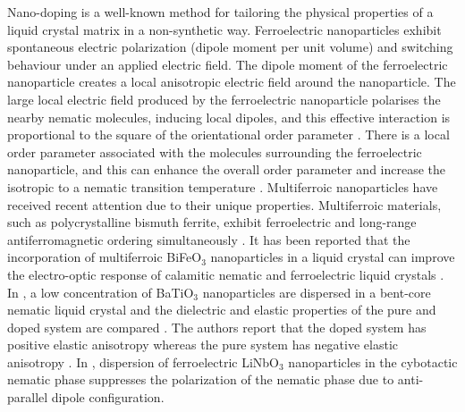 \documentclass[reprint,amsfonts,amsmath,amssymb,aps,pre,floatfix,10pt]{revtex4-1}
\begin{document}
Nano-doping is a well-known method for tailoring the physical properties of a liquid crystal matrix in a non-synthetic way. Ferroelectric nanoparticles exhibit spontaneous electric polarization (dipole moment per unit volume) and switching behaviour under an applied electric field. The dipole moment of the ferroelectric nanoparticle creates a local anisotropic electric field around the nanoparticle. The large local electric field produced by the ferroelectric nanoparticle polarises the nearby nematic molecules, inducing local dipoles, and this effective interaction is proportional to the square of the orientational order parameter \cite{li2006orientational_14}. There is a local order parameter associated with the molecules surrounding the ferroelectric nanoparticle, and this can enhance the overall order parameter and increase the isotropic to a nematic transition temperature \cite{lopatina2009theory_13}. Multiferroic nanoparticles have received recent attention due to their unique properties. Multiferroic materials, such as polycrystalline bismuth ferrite, exhibit ferroelectric and long-range antiferromagnetic ordering simultaneously \cite{kalinin2002potential_15,seidel2009conduction_16}. It has been reported that the incorporation of multiferroic BiFeO$_{3}$ nanoparticles in a liquid crystal can improve the electro-optic response of calamitic nematic and ferroelectric liquid crystals \cite{nayek2015superior_17, khan2020bismuth_18, ghosh2011effect_19}. In \cite{khan2017elastic_11}, a low concentration of BaTiO$_{3}$ nanoparticles are dispersed in a bent-core nematic liquid crystal and the dielectric and elastic properties of the pure and doped system are compared \cite{khan2017elastic_11}. The authors report that the doped system has positive elastic anisotropy whereas the pure system has negative elastic anisotropy \cite{khan2017elastic_11}. In \cite{derbali2020dielectric_33}, dispersion of ferroelectric LiNbO$_{3}$ nanoparticles in the cybotactic nematic phase suppresses the polarization of the nematic phase due to anti-parallel dipole configuration.
\end{document}
